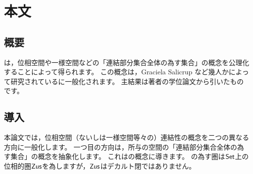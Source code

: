 \section{本文}

\subsection{概要}

\WordConnectivitySpace は，位相空間や一様空間などの「連結部分集合全体の為す集合」の概念を公理化することによって得られます。
この概念は，Graciela Salicrup など幾人かによって研究されている\WordComponentCategory に一般化されます。
主結果は著者の学位論文から引いたものです\cite{boerger--1981}。

\subsection{導入}

本論文では，位相空間（ないしは一様空間等々の）連結性の概念を二つの異なる方向に一般化します。
一つ目の方向は，所与の空間の「連結部分集合全体の為す集合」の概念を抽象化します。
これは\WordConnectivitySpace の概念に導きます。
\WordConnectivitySpace の為す圏は\(\mathsf{Set}\)上の位相的圏\(\mathsf{Zus}\)を為しますが，\(\mathsf{Zus}\)はデカルト閉ではありません。

